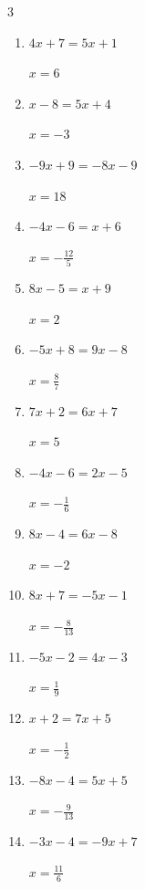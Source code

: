 \begin{multicols}{3}
\begin{enumerate}
        $\displaystyle x=-6$

  \item $4x+7=5x+1$

        $\displaystyle x=6$

  \item $x-8=5x+4$

        $\displaystyle x=-3$

  \item $-9x+9=-8x-9$

        $\displaystyle x=18$

  \item $-4x-6=x+6$

        $\displaystyle x=-\frac{12}{5}$

  \item $8x-5=x+9$

        $\displaystyle x=2$

  \item $-5x+8=9x-8$

        $\displaystyle x=\frac{8}{7}$

  \item $7x+2=6x+7$

        $\displaystyle x=5$

\columnbreak %

  \item $-4x-6=2x-5$

        $\displaystyle x=-\frac{1}{6}$

  \item $8x-4=6x-8$

        $\displaystyle x=-2$

  \item $8x+7=-5x-1$

        $\displaystyle x=-\frac{8}{13}$

  \item $-5x-2=4x-3$

        $\displaystyle x=\frac{1}{9}$

  \item $x+2=7x+5$

        $\displaystyle x=-\frac{1}{2}$

  \item $-8x-4=5x+5$

        $\displaystyle x=-\frac{9}{13}$

  \item $-3x-4=-9x+7$

        $\displaystyle x=\frac{11}{6}$


\end{enumerate}
\end{multicols}
